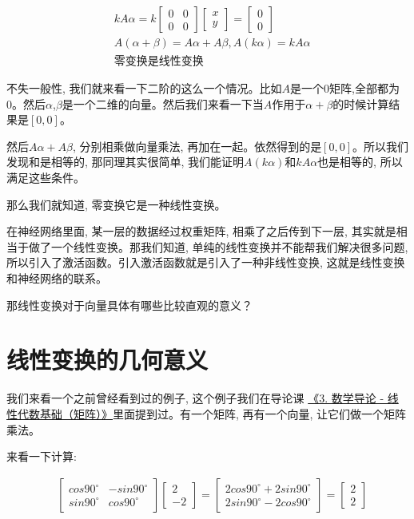 \begin{align*}
  & kA\alpha = k\begin{bmatrix} 0 & 0 \\ 0 & 0\end{bmatrix}\begin{bmatrix}x \\ y \end{bmatrix} = \begin{bmatrix} 0 \\ 0 \end{bmatrix}\\
  & A(\alpha+\beta) = A\alpha + A\beta, A(k\alpha) = kA\alpha \\
  &  \mbox{零变换是线性变换}
\end{align*}

不失一般性, 我们就来看一下二阶的这么一个情况。比如$A$是一个0矩阵,全部都为0。然后$\alpha$,$\beta$是一个二维的向量。然后我们来看一下当$A$作用于$\alpha+\beta$的时候计算结果是$[0,0]$。

然后$A\alpha+A\beta$, 分别相乘做向量乘法, 再加在一起。依然得到的是$[0, 0]$。所以我们发现和是相等的, 那同理其实很简单, 我们能证明$A(k\alpha)$和$kA\alpha$也是相等的, 所以满足这些条件。

那么我们就知道, 零变换它是一种线性变换。

在神经网络里面, 某一层的数据经过权重矩阵, 相乘了之后传到下一层, 其实就是相当于做了一个线性变换。那我们知道, 单纯的线性变换并不能帮我们解决很多问题, 所以引入了激活函数。引入激活函数就是引入了一种非线性变换, 这就是线性变换和神经网络的联系。

那线性变换对于向量具体有哪些比较直观的意义？

\section{线性变换的几何意义}

我们来看一个之前曾经看到过的例子, 这个例子我们在导论课 \hyperlink{3.线性代数基础}{《3. 数学导论 - 线性代数基础（矩阵）》}里面提到过。有一个矩阵, 再有一个向量, 让它们做一个矩阵乘法。

来看一下计算: 

\begin{align*}
  & \begin{bmatrix}
  cos90^{\circ} & -sin90^{\circ} \\
  sin90^{\circ} & cos90^{\circ}
  \end{bmatrix}
  \begin{bmatrix}
  2 \\ -2
  \end{bmatrix} 
  = \begin{bmatrix}
  2cos90^{\circ} + 2sin90^{\circ} \\
  2sin90^{\circ} - 2cos90^{\circ}
  \end{bmatrix} 
  = \begin{bmatrix} 2 \\ 2 \end{bmatrix}
\end{align*}

